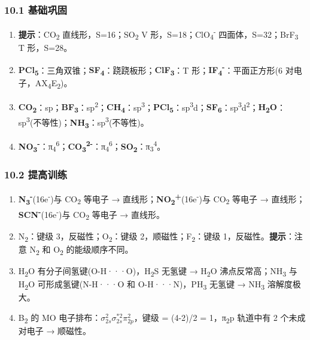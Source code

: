 \subsubsection{10.1 基础巩固}\label{ux57faux7840ux5de9ux56fa-1}

\begin{enumerate}
\def\labelenumi{\arabic{enumi}.}
\item
  \textbf{提示}：CO\textsubscript{2} 直线形，S=16；SO\textsubscript{2} V 形，S=18；ClO\textsubscript{4}\textsuperscript{-} 四面体，S=32；BrF\textsubscript{3} T 形，S=28。
\item
  \textbf{PCl\textsubscript{5}}：三角双锥；\textbf{SF\textsubscript{4}}：跷跷板形；\textbf{ClF\textsubscript{3}}：T 形；\textbf{IF\textsubscript{4}\textsuperscript{-}}：平面正方形(6 对电子，AX\textsubscript{4}E\textsubscript{2})。
\item
  \textbf{CO\textsubscript{2}}：sp；\textbf{BF\textsubscript{3}}：sp\textsuperscript{2}；\textbf{CH\textsubscript{4}}：sp\textsuperscript{3}；\textbf{PCl\textsubscript{5}}：sp\textsuperscript{3}d；\textbf{SF\textsubscript{6}}：sp\textsuperscript{3}d\textsuperscript{2}；\textbf{H\textsubscript{2}O}：sp\textsuperscript{3}(不等性)；\textbf{NH\textsubscript{3}}：sp\textsuperscript{3}(不等性)。
\item
  \textbf{NO\textsubscript{3}\textsuperscript{-}}：π\textsubscript{4}\textsuperscript{6}；\textbf{CO\textsubscript{3}\textsuperscript{2-}}：π\textsubscript{4}\textsuperscript{6}；\textbf{SO\textsubscript{2}}：π\textsubscript{3}\textsuperscript{4}。
\end{enumerate}

\subsubsection{10.2 提高训练}\label{ux63d0ux9ad8ux8badux7ec3-1}

\begin{enumerate}
\def\labelenumi{\arabic{enumi}.}
\setcounter{enumi}{4}
\item
  \textbf{N\textsubscript{3}\textsuperscript{-}}(16e\textsuperscript{-})与 CO\textsubscript{2} 等电子 → 直线形；\textbf{NO\textsubscript{2}\textsuperscript{+}}(16e\textsuperscript{-})与 CO\textsubscript{2} 等电子 → 直线形；\textbf{SCN\textsuperscript{-}}(16e\textsuperscript{-})与 CO\textsubscript{2} 等电子 → 直线形。
\item
  N\textsubscript{2}：键级 3，反磁性；O\textsubscript{2}：键级 2，顺磁性；F\textsubscript{2}：键级 1，反磁性。\textbf{提示}：注意 N\textsubscript{2} 和 O\textsubscript{2} 的能级顺序不同。
\item
  H\textsubscript{2}O 有分子间氢键(O-H···O)，H\textsubscript{2}S 无氢键 → H\textsubscript{2}O 沸点反常高；NH\textsubscript{3} 与 H\textsubscript{2}O 可形成氢键(N-H···O 和 O-H···N)，PH\textsubscript{3} 无氢键 → NH\textsubscript{3} 溶解度极大。
\item
  B\textsubscript{2} 的 MO 电子排布：\(\sigma_{2s}^2 \sigma_{2s}^{*2} \pi_{2p}^2\)，键级 = (4-2)/2 = 1，π\textsubscript{2}p 轨道中有 2 个未成对电子 → 顺磁性。
\end{enumerate}

